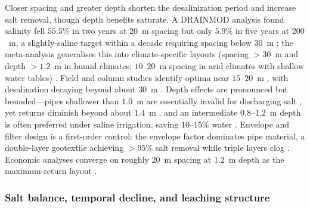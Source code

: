 Closer spacing and greater depth shorten the desalinization period and increase
salt removal, though depth benefits saturate. A DRAINMOD analysis found salinity
fell $55.5\%$ in two years at $20$~m spacing but only $5.9\%$ in five years at
$200$~m, a slightly-saline target within a decade requiring spacing below $30$~m
\parencite{Chen2025}; the meta-analysis generalises this into climate-specific
layouts (spacing $>30$~m and depth $>1.2$~m in humid climates; $10$--$20$~m
spacing in arid climates with shallow water tables) \parencite{Yang2025}. Field
and column studies identify optima near $15$--$20$~m
\parencite{Wang2020,Han2023,Chen2022}, with desalination decaying beyond about
$30$~m \parencite{Zhu2025b}. Depth effects are pronounced but bounded---pipes
shallower than $1.0$~m are essentially invalid for discharging salt
\parencite{Qian2021b}, yet returns diminish beyond about $1.4$~m
\parencite{Bahçeci2007,Bahçeci2006}, and an intermediate $0.8$--$1.2$~m depth is
often preferred under saline irrigation, saving $10$--$15\%$ water
\parencite{Feng2017,Muhammad2021}. Envelope and filter design is a first-order
control: the envelope factor dominates pipe material, a double-layer geotextile
achieving $>95\%$ salt removal while triple layers clog
\parencite{Li2022,Wang2024d,Elzoghby2021}. Economic analyses converge on roughly
$20$~m spacing at $1.2$~m depth as the maximum-return layout \parencite{Chen2025}.

\subsubsection{Salt balance, temporal decline, and leaching structure}

